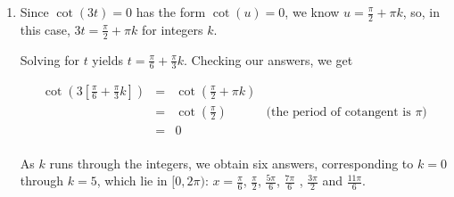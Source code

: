 \documentclass{ximera}
\begin{document}
\begin{example}
\begin{explanation}
\begin{enumerate}
\[\begin{array}{rclr}
\csc\left(\frac{1}{3} \left[ \frac{15\pi}{4} + 6 \pi  k \right] - \pi   \right)  &  = &  \csc\left(\frac{5\pi}{4} + 2\pi k - \pi \right) & \\   
& =  &   \csc\left(\frac{\pi}{4} + 2\pi k\right) &  \\   
& =  & \csc\left(\frac{\pi}{4}\right) & \text{(the period of cosecant is $2\pi$)} \\
& = & \sqrt{2} & \\
\end{array}\] 



The family $\theta = \frac{21\pi}{4} + 6 \pi  k$ checks similarly. 

 

 Despite having infinitely many solutions, we find that \textit{none} of them lie in $[0,2\pi)$. 
 
  
 
To verify this graphically, we check that $y = \csc\left(\frac{1}{3} \theta -\pi\right)$ and $y =\sqrt{2}$ do not intersect at all over the interval $[0,2\pi)$.

\begin{center}
\end{center}

\item  Since $\cot(3t) = 0$ has the form $\cot(u) = 0$, we know $u = \frac{\pi}{2} + \pi k$, so, in this case,  $3t =  \frac{\pi}{2} + \pi k$ for integers $k$.  


Solving for $t$ yields $t = \frac{\pi}{6} + \frac{\pi}{3} k$.  Checking our answers, we get

\[ \begin{array}{rclr}

\cot\left(3\left[ \frac{\pi}{6} + \frac{\pi}{3} k\right]\right)  &  = &  \cot\left(\frac{\pi}{2} + \pi k\right)  & \\   
& =  &   \cot\left(\frac{\pi}{2}\right) &  \text{(the period of cotangent is $\pi$)} \\   
& =  & 0 & \\
\end{array}\] 

 As $k$ runs through the integers, we obtain six answers, corresponding to $k=0$ through $k=5$, which lie in $[0, 2\pi)$: $x = \frac{\pi}{6}$, $\frac{\pi}{2}$, $\frac{5\pi}{6}$, $\frac{7\pi}{6}$ , $\frac{3\pi}{2}$ and  $\frac{11\pi}{6}$. 
 
  
 

\end{enumerate}
\end{explanation}
\end{example}
\end{document}
